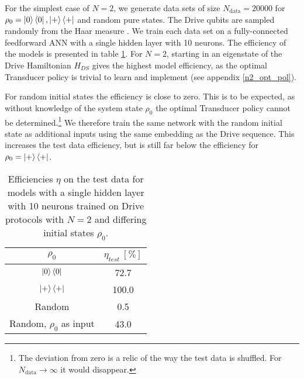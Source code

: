 For the simplest case of $N = 2$, we generate data sets of size $N_{\mathrm{data}} = 20000$ for $\rho_0 = \ket{0} \bra{0}, \ket{+} \bra{+}$ and random pure states.
The Drive qubits are sampled randomly from the Haar measure \cite{Mezzadri}.
We train each data set on a fully-connected feedforward ANN with a single hidden layer with 10 neurons.
The efficiency of the models is presented in table \ref{n2efftable}.
For $N = 2$, starting in an eigenstate of the Drive Hamiltonian $H_{DS}$ gives the highest model efficiency, as the optimal Transducer policy is trivial to learn and implement (see appendix \ref{n2_opt_pol}).

For random initial states the efficiency is close to zero.
This is to be expected, as without knowledge of the system state $\rho_0$ the optimal Transducer policy cannot be determined.\footnote{The deviation from zero is a relic of the way the test data is shuffled. For $N_{\mathrm{data}} \to \infty$ it would disappear.}
We therefore train the same network with the random initial state as additional inputs using the same embedding as the Drive sequence.
This increases the test data efficiency, but is still far below the efficiency for $\rho_0 = \ket{+} \bra{+}$.


\begin{table}[h]
	\centering
	\begin{tabular}{ c | c }
		$\rho_0$ & $\eta_{test} \ [\%]$ \\
		\hline
		$\ket{0} \bra{0}$ & 72.7 \\
		$\ket{+} \bra{+}$ & 100.0 \\
		Random & 0.5 \\
		Random, $\rho_0$ as input & 43.0 \\
	\end{tabular}
	\caption{Efficiencies $\eta$ on the test data for models with a single hidden layer with 10 neurons trained on Drive protocols with $N = 2$ and differing initial states $\rho_0$.}
	\label{n2efftable}
\end{table}



